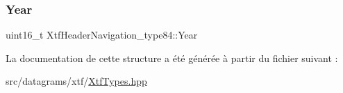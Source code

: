 \mbox{\label{structXtfHeaderNavigation__type84_af0440a4e0cf1b51ca5a3c0a97aaf1f84}} 
\subsubsection{\texorpdfstring{Year}{Year}}
{\footnotesize\ttfamily uint16\+\_\+t Xtf\+Header\+Navigation\+\_\+type84\+::\+Year}



La documentation de cette structure a été générée à partir du fichier suivant \+:\begin{DoxyCompactItemize}
\item 
src/datagrams/xtf/\hyperlink{XtfTypes_8hpp}{Xtf\+Types.\+hpp}\end{DoxyCompactItemize}
